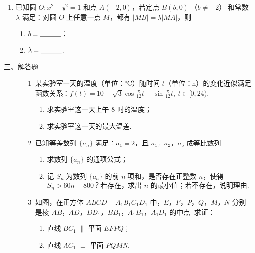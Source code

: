\begin{description}
\begin{enumerate}[leftmargin=5pt]
        \item 已知圆 \(O: x^{2} + y^{2} = 1\) 和点 \(A(-2,0)\)，若定点 \(B(b,0)\) （\(b \neq -2\)） 和常数 \(\lambda\) 满足：对圆 \(O\) 上任意一点 \(M\)，都有 \(|MB| = \lambda |MA|\)，则
\begin{enumerate}
\item \( b =\rule[-0.3ex]{3em}{0.4pt} \)；
\item \(\lambda =\rule[-0.3ex]{3em}{0.4pt} \).
\end{enumerate}

    \end{enumerate}

\end{description}

\begin{description}

    \item[三、解答题]

    \begin{enumerate}[leftmargin=5pt]

      \addtocounter{enumi}{+17}

        \item 某实验室一天的温度（单位：\(^{\circ}\mathrm{C}\)）随时间 \(t\)（单位：\(\mathrm{h}\)）的变化近似满足函数关系：\( f(t)=10-\sqrt{3}\cos\frac{\pi}{12}t-\sin\frac{\pi}{12}t,\ t\in[0,24) \).
\begin{enumerate}
\item 求实验室这一天上午 \(8\) 时的温度；
\item 求实验室这一天的最大温差.
\end{enumerate}

        \item 已知等差数列 \(\{a_{n}\}\) 满足：\(a_1 = 2\)，且 \(a_1\)，\(a_2\)，\(a_5\) 成等比数列.
\begin{enumerate}
\item 求数列 \(\{a_{n}\}\) 的通项公式；
\item 记 \(S_{n}\) 为数列 \(\{a_{n}\}\) 的前 \(n\) 项和，是否存在正整数 \(n\)，使得 \(S_{n} > 60n + 800\)？若存在，求出 \(n\) 的最小值；若不存在，说明理由.
\end{enumerate}

        \item 如图，在正方体 \(ABCD - A_{1}B_{1}C_{1}D_{1}\) 中，\(E\)，\(F\)，\(P\)，\(Q\)，\(M\)，\(N\) 分别是棱 \(AB\)，\(AD\)，\(DD_{1}\)，\(BB_{1}\)，\(A_{1}B_{1}\)，\(A_{1}D_{1}\) 的中点. 求证：

\begin{enumerate}
\item 直线 \(BC_{1}\) \(\parallel\) 平面 \(EFPQ\)；
\item 直线 \(AC_{1}\) \(\perp\) 平面 \(PQMN\).
\end{enumerate}


\end{enumerate}
\end{description}
